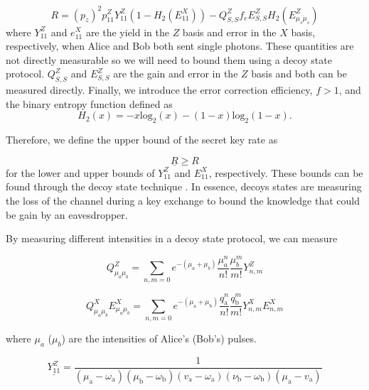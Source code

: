 \begin{equation}
	R = (p_z)^2 p_{11}^Z Y_{11}^Z \left(1 - H_2(E_{11}^X)\right) - Q_{S,S}^Z f_e E_{S,S}^Z H_2(E_{\mu_s\mu_s}^Z)
\end{equation}
where $Y_{11}^Z$ and $e_{11}^X$ are the yield in the $Z$ basis and error in the $X$ basis, respectively, when Alice and Bob both sent single photons. These quantities are not directly measurable so we will need to bound them using a decoy state protocol. $Q_{S,S}^Z$ and $E_{S,S}^Z$ are the gain and error in the $Z$ basis and both can be measured directly. Finally, we introduce the error correction efficiency, $f>1$, and the binary entropy function defined as
\begin{equation}
	H_2(x) = -x\mathrm{log}_2(x) - (1-x)\mathrm{log}_2(1-x).
\end{equation}

Therefore, we define the upper bound of the secret key rate as

\begin{equation}
	\underline{R} \geq R
\end{equation}
for the lower and upper bounds of $Y_{11}^Z$ and $E_{11}^X$, respectively. These bounds can be found through the decoy state technique \cite{}. In essence, decoys states are measuring the loss of the channel during a key exchange to bound the knowledge that could be gain by an eavesdropper. 

By measuring different intensities in a decoy state protocol, we can measure

\begin{equation}
	Q_{\mu_a \mu_b}^Z = \sum_{n,m=0} e^{-(\mu_a + \mu_b)}\frac{\mu_a^n}{n!}\frac{\mu_b^m}{m!} Y_{n,m}^Z
\end{equation}

\begin{equation}
	Q_{\mu_{a} \mu_{b}}^X E^{X}_{\mu_{a} \mu_{b}}=\sum_{n, m=0} e^{-\left(\mu_{\mathrm{a}}+\mu_{\mathrm{b}}\right)} \frac{q_{\mathrm{a}}^{n}}{n !} \frac{q_{\mathrm{b}}^{m}}{m !} Y^{X}_{n, m} E^{X}_{n, m}
\end{equation}

where $\mu_a$ ($\mu_b$) are the intensities of Alice's (Bob's) pulses.

\begin{equation}
	\underline{Y_{11}^Z} = \frac{1}{\left(\mu_{\mathrm{a}}-\omega_{\mathrm{a}}\right)\left(\mu_{\mathrm{b}}-\omega_{\mathrm{b}}\right)\left(v_{\mathrm{a}}-\omega_{\mathrm{a}}\right)\left(\nu_{\mathrm{b}}-\omega_{\mathrm{b}}\right)\left(\mu_{\mathrm{a}}-v_{\mathrm{a}}\right)}
\end{equation}


